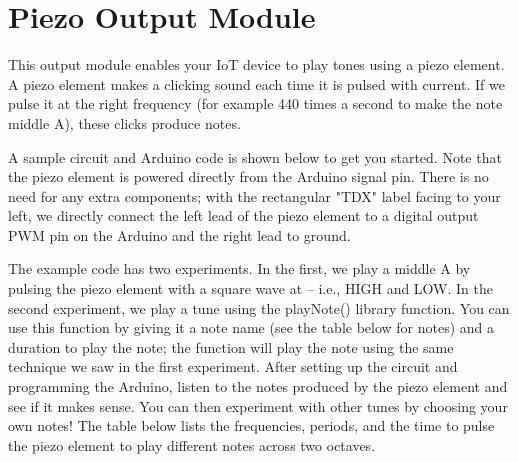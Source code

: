 
\clearpage
\section{Piezo Output Module}
\label{sec-output-piezo}

This output module enables your IoT device to play tones using a piezo
element. A piezo element makes a clicking sound each time it is pulsed
with current. If we pulse it at the right frequency (for example 440
times a second to make the note middle A), these clicks produce notes.

A sample circuit and Arduino code is shown below to get you started.
Note that the piezo element is powered directly from the Arduino signal
pin. There is no need for any extra components; with the rectangular
"TDX" label facing to your left, we directly connect the left lead of
the piezo element to a digital output PWM pin on the Arduino and the
right lead to ground.

The example code has two experiments. In the first, we play a middle A
by pulsing the piezo element with a square wave at  -- i.e.,
 HIGH and  LOW. In the second
experiment, we play a tune using the playNote() library function. You
can use this function by giving it a note name (see the table below for
notes) and a duration to play the note; the function will play the note
using the same technique we saw in the first experiment. After setting
up the circuit and programming the Arduino, listen to the notes produced
by the piezo element and see if it makes sense. You can then experiment
with other tunes by choosing your own notes! The table below lists the
frequencies, periods, and the time to pulse the piezo element to play
different notes across two octaves.


